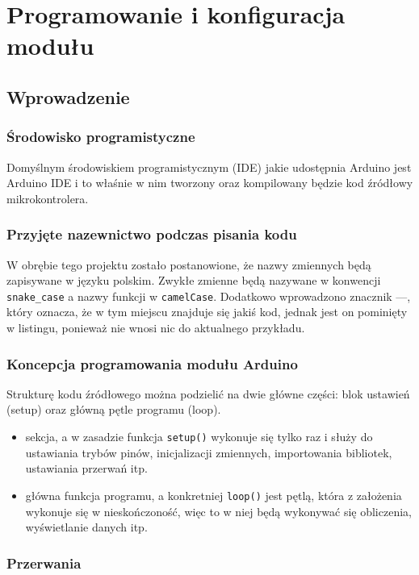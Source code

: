 \chapter{Programowanie i konfiguracja modułu}
\section{Wprowadzenie}
\subsection{Środowisko programistyczne}

Domyślnym środowiskiem programistycznym (IDE) jakie udostępnia Arduino jest Arduino IDE i to właśnie w nim tworzony oraz kompilowany będzie kod źródłowy mikrokontrolera.

\subsection{Przyjęte nazewnictwo podczas pisania kodu}
W obrębie tego projektu zostało postanowione, że nazwy zmiennych będą zapisywane w języku polskim. Zwykłe zmienne będą nazywane w konwencji \texttt{snake\_case} a nazwy funkcji w \texttt{camelCase}. Dodatkowo wprowadzono znacznik ---, który oznacza, że w tym miejscu znajduje się jakiś kod, jednak jest on pominięty w listingu, ponieważ nie wnosi nic do aktualnego przykładu.

\subsection{Koncepcja programowania modułu Arduino}
Strukturę kodu źródłowego można podzielić na dwie główne części: blok ustawień (setup) oraz główną pętle programu (loop).
\begin{itemize}
\item{sekcja, a w zasadzie funkcja \texttt{setup()} wykonuje się tylko raz i służy do ustawiania trybów pinów, inicjalizacji zmiennych, importowania bibliotek, ustawiania przerwań itp.}
\item{główna funkcja programu, a konkretniej \texttt{loop()} jest pętlą, która z założenia wykonuje się w nieskończoność, więc to w niej będą wykonywać się obliczenia, wyświetlanie danych itp.}
\end{itemize}

\subsection{Przerwania}
